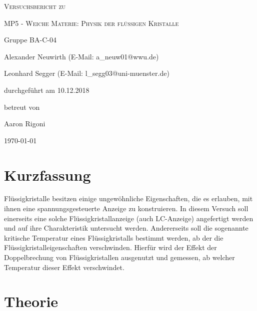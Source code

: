 \documentclass[
	a4paper,
	12pt,
	pagesize,
	ngerman
]{scrartcl}
\begin{document}
	\begin{titlepage}
		\centering
		{\scshape\LARGE Versuchsbericht zu \par}
		\vspace{1cm}
		{\scshape\huge MP5 - Weiche Materie: Physik der
flüssigen Kristalle \par} %
		\vspace{2.5cm}
		{\LARGE Gruppe BA-C-04 \par}
		\vspace{0.5cm}

		{\large Alexander Neuwirth (E-Mail: a\_neuw01@wwu.de) \par}
		{\large Leonhard Segger (E-Mail: l\_segg03@uni-muenster.de) \par}
		\vfill

		durchgeführt am 10.12.2018\par
		betreut von\par
		{\large Aaron Rigoni}

		\vfill

		{\large \today\par}
	\end{titlepage}
	\tableofcontents
	\newpage


	\section{Kurzfassung}
	Flüssigkristalle besitzen einige ungewöhnliche Eigenschaften, die es erlauben, mit ihnen eine spannungsgesteuerte Anzeige zu konstruieren.
	In diesem Versuch soll einerseits eine solche Flüssigkristallanzeige (auch LC-Anzeige) angefertigt werden und auf ihre Charakteristik untersucht werden.
	Andererseits soll die sogenannte kritische Temperatur eines Flüssigkristalls bestimmt werden, ab der die Flüssigkristalleigenschaften verschwinden.
	Hierfür wird der Effekt der Doppelbrechung von Flüssigkristallen ausgenutzt und gemessen, ab welcher Temperatur dieser Effekt verschwindet.

	\section{Theorie}
\end{document}
